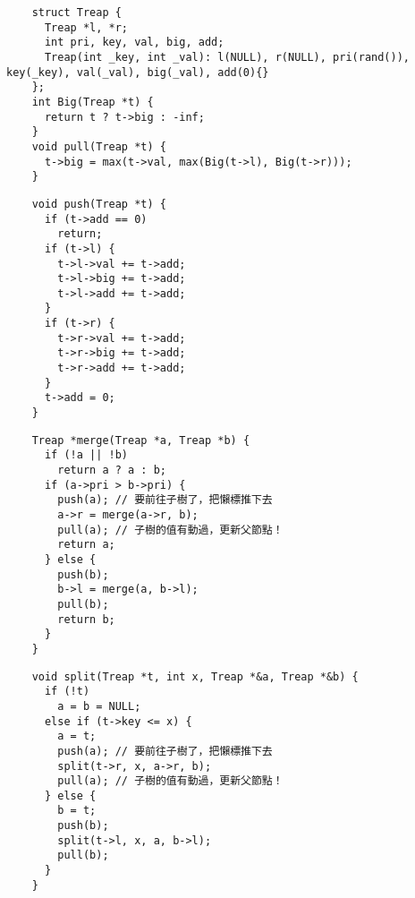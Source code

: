 \documentclass[standalone]{beamer}
\begin{document}
\begin{frame}[fragile]{}
  \begin{verbatim}
    struct Treap {
      Treap *l, *r;
      int pri, key, val, big, add;
      Treap(int _key, int _val): l(NULL), r(NULL), pri(rand()), key(_key), val(_val), big(_val), add(0){}
    };
    int Big(Treap *t) {
      return t ? t->big : -inf;
    }
    void pull(Treap *t) {
      t->big = max(t->val, max(Big(t->l), Big(t->r)));
    }
  \end{verbatim}
\end{frame}

\begin{frame}[fragile]{}
  \begin{verbatim}
    void push(Treap *t) {
      if (t->add == 0)
        return;
      if (t->l) {
        t->l->val += t->add;
        t->l->big += t->add;
        t->l->add += t->add;
      }
      if (t->r) {
        t->r->val += t->add;
        t->r->big += t->add;
        t->r->add += t->add;
      }
      t->add = 0;
    }
  \end{verbatim}
\end{frame}

\begin{frame}[fragile]{}
  \begin{verbatim}
    Treap *merge(Treap *a, Treap *b) {
      if (!a || !b)
        return a ? a : b;
      if (a->pri > b->pri) {
        push(a); // 要前往子樹了，把懶標推下去
        a->r = merge(a->r, b);
        pull(a); // 子樹的值有動過，更新父節點！
        return a;
      } else {
        push(b);
        b->l = merge(a, b->l);
        pull(b);
        return b;
      }
    }
  \end{verbatim}
\end{frame}

\begin{frame}[fragile]{}
  \begin{verbatim}
    void split(Treap *t, int x, Treap *&a, Treap *&b) {
      if (!t)
        a = b = NULL;
      else if (t->key <= x) {
        a = t;
        push(a); // 要前往子樹了，把懶標推下去
        split(t->r, x, a->r, b);
        pull(a); // 子樹的值有動過，更新父節點！
      } else {
        b = t;
        push(b);
        split(t->l, x, a, b->l);
        pull(b);
      }
    }
  \end{verbatim}
\end{frame}
\end{document}
